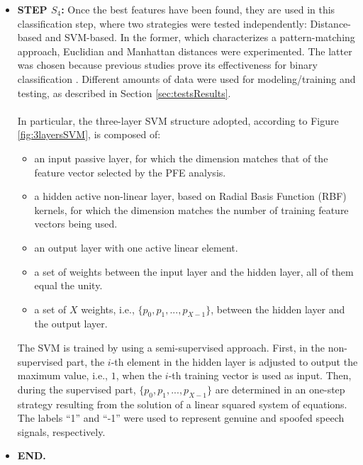 \begin{itemize}
\item{}\textbf{STEP $S_4$: }Once the best features have been found, they are used in this classification step, where two strategies were tested independently: Distance-based and SVM-based. In the former, which characterizes a pattern-matching approach, Euclidian and Manhattan distances were experimented. The latter was chosen because previous studies prove its effectiveness for binary classification \cite{bennett2000support}. Different amounts of data were used for modeling/training and testing, as described in Section \ref{sec:testsResults}.
\\
\\
In particular, the three-layer SVM structure adopted, according to Figure \ref{fig:3layersSVM}, is composed of:
	\begin{itemize}
	\item{}an input passive layer, for which the dimension matches that of the feature vector selected by the PFE analysis.
	\item{}a hidden active non-linear layer, based on Radial Basis Function (RBF) kernels, for which the dimension matches the number of training feature vectors being used. 
	\item{}an output layer with one active linear element. 
    \item{}a set of weights between the input layer and the hidden layer, all of them equal the unity. 
    \item{}a set of $X$ weights, i.e., $\{p_0, p_1, ..., p_{X-1}\}$, between the hidden layer and the output layer.
    \end{itemize}
The SVM is trained by using a semi-supervised approach. First, in the non-supervised part, the $i$-th element in the hidden layer is adjusted to output the maximum value, i.e., $1$, when the $i$-th training vector is used as input. Then, during the supervised part, $\{p_0, p_1, ..., p_{X-1}\}$ are determined in an one-step strategy resulting from the solution of a linear squared system of equations\cite{poole2014linear}. The labels ``1'' and ``-1'' were used to represent genuine and spoofed speech signals, respectively.  
\item{}\textbf{END.}
\end{itemize}


